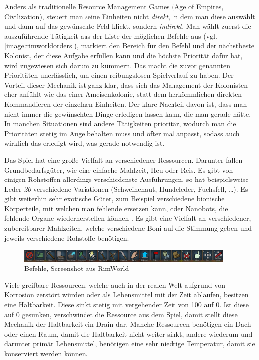 Anders als traditionelle Resource Management Games (Age of Empires, Civilization), steuert man seine Einheiten nicht \textit{direkt}, in dem man diese auswählt und dann auf das gewünschte Feld klickt, sondern \textit{indirekt}. Man wählt zuerst die auszuführende Tätigkeit aus der Liste der möglichen Befehle aus (vgl. \autoref{image:rimworldorders}), markiert den Bereich für den Befehl und der nächstbeste Kolonist, der diese Aufgabe erfüllen kann und die höchste Priorität dafür hat, wird zugewiesen sich darum zu kümmern. Das macht die zuvor genannten Prioritäten unerlässlich, um einen reibungslosen Spielverlauf zu haben. Der Vorteil dieser Mechanik ist ganz klar, dass sich das Management der Kolonisten eher anfühlt wie das einer Ameisenkolonie, statt dem herkömmlichen direkten Kommandieren der einzelnen Einheiten. Der klare Nachteil davon ist, dass man nicht immer die gewünschten Dinge erledigen lassen kann, die man gerade hätte. In manchen Situationen sind andere Tätigkeiten prioritär, wodurch man die Prioritäten stetig im Auge behalten muss und öfter mal anpasst, sodass auch wirklich das erledigt wird, was gerade notwendig ist.

Das Spiel hat eine große Vielfalt an verschiedener Ressourcen. Darunter fallen Grundbedarfsgüter, wie eine einfache Mahlzeit, Heu oder Reis. Es gibt von einigen Rohstoffen allerdings verschiedenste Ausführungen, so hat beispielsweise Leder \textit{20} verschiedene Variationen (Schweinehaut, Hundeleder, Fuchsfell, \dots). Es gibt weiterhin sehr exotische Güter, zum Beispiel verschiedene bionische Körperteile, mit welchen man fehlende ersetzen kann, oder Nanobots, die fehlende Organe wiederherstellen können \cite*[]{rimworld:resources}. Es gibt eine Vielfalt an verschiedener, zubereitbarer Mahlzeiten, welche verschiedene Boni auf die Stimmung geben und jeweils verschiedene Rohstoffe benötigen.


\begin{figure}
    \begin{center}
        \includegraphics[width=400px]{0.bilder/rimworldorders.png}
    \end{center}
    \caption{Befehle, Screenshot aus RimWorld} \label{image:rimworldorders}
\end{figure}

Viele greifbare Ressourcen, welche auch in der realen Welt aufgrund von Korrosion zerstört würden oder als Lebensmittel mit der Zeit ablaufen, besitzen eine Haltbarkeit. Diese sinkt stetig mit vergehender Zeit von 100 auf 0. Ist diese auf 0 gesunken, verschwindet die Ressource aus dem Spiel, damit stellt diese Mechanik der Haltbarkeit ein Drain dar. Manche Ressourcen benötigen ein Dach oder einen Raum, damit die Haltbarkeit nicht weiter sinkt, andere wiederum und darunter primär Lebensmittel, benötigen eine sehr niedrige Temperatur, damit sie konserviert werden können.
